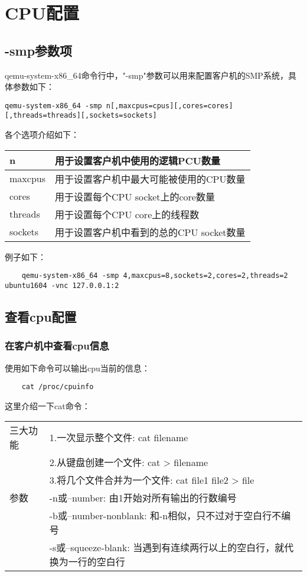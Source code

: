 \documentclass[a4paper,left=2.5cm,right=2.5cm,11pt]{article}
\newcommand{\interval}{\vspace{0.5em}}
\begin{document}
\tableofcontents

\clearpage

\section{CPU配置}
\subsection{-smp参数项}
	qemu-system-x86\_64命令行中，"-smp"参数可以用来配置客户机的SMP系统，具体参数如下：
	\begin{lstlisting}[numberstyle = \color{white}]
	qemu-system-x86_64 -smp n[,maxcpus=cpus][,cores=cores][,threads=threads][,sockets=sockets]
	\end{lstlisting}

	各个选项介绍如下：
	\interval
	\begin{longtable}{p{1.5cm}p{10cm}}
	\hline
	n & 用于设置客户机中使用的逻辑PCU数量 \\
	\hline
	maxcpus & 用于设置客户机中最大可能被使用的CPU数量 \\
	\hline
	cores & 用于设置每个CPU socket上的core数量 \\
	\hline
	threads & 用于设置每个CPU core上的线程数 \\
	\hline
	sockets & 用于设置客户机中看到的总的CPU socket数量 \\
	\hline
	\end{longtable}
	\interval

	例子如下：
	\begin{lstlisting}
	qemu-system-x86_64 -smp 4,maxcpus=8,sockets=2,cores=2,threads=2 ubuntu1604 -vnc 127.0.0.1:2
	\end{lstlisting}

\subsection{查看cpu配置}
\subsubsection{在客户机中查看cpu信息}
	使用如下命令可以输出cpu当前的信息：
	\begin{lstlisting}
	cat /proc/cpuinfo
	\end{lstlisting}

	这里介绍一下cat命令：
	\interval
	\begin{longtable}{lp{12cm}}
	\hline
	三大功能 & 1.一次显示整个文件: cat filename \\
		   & 2.从键盘创建一个文件: cat > filename \\
		   & 3.将几个文件合并为一个文件: cat file1 file2 > file \\
	\hline
	参数  & -n或--number: 由1开始对所有输出的行数编号 \\
		 & -b或--number-nonblank: 和-n相似，只不过对于空白行不编号 \\
		 & -s或--squeeze-blank: 当遇到有连续两行以上的空白行，就代换为一行的空白行 \\
	\hline  
	\end{longtable}
	\interval
\end{document}
